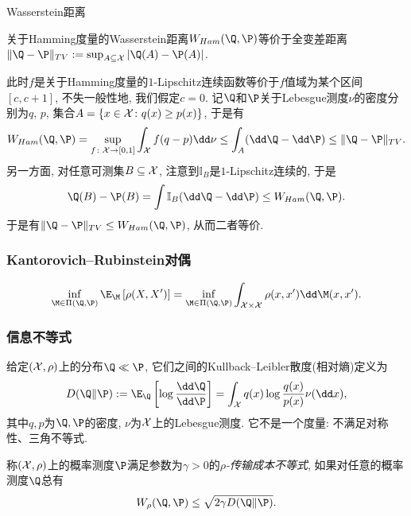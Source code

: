 Wasserstein距离


\begin{example}[Hamming度量和全变差距离]
	关于Hamming度量的Wasserstein距离$W_{Ham}(\Q, \P)$等价于全变差距离$\|\Q - \P\|_{TV} := \sup_{A \subseteq \cX} |\Q(A) - \P(A)|$. 
	
	此时$f$是关于Hamming度量的$1$-Lipschitz连续函数等价于$f$值域为某个区间$[c, c+1]$, 不失一般性地, 我们假定$c = 0$. 
	记$\Q$和$\P$关于Lebesgue测度$\nu$的密度分别为$q$, $p$, 集合$A = \{x \in \mathcal{X} \colon q(x) \geq p(x)\} $, 于是有
	\begin{equation*}
		W_{Ham}(\Q, \P)
		= \sup_{f \colon \cX \to [0, 1]} \int_{\cX} f (q - p) \dd \nu 
		\leq \int_A (\dd \Q - \dd \P)
		\leq \|\Q - \P\|_{TV}. 
	\end{equation*}
	另一方面, 对任意可测集$B \subseteq \mathcal{X}$, 注意到$\mathbb{I}_B$是$1$-Lipschitz连续的, 于是
	\begin{equation*}
		\Q(B) - \P(B) 
		= \int \mathbb{I}_B (\dd \Q - \dd \P) 
		\leq W_{Ham}(\Q, \P). 
	\end{equation*}
	于是有$\|\Q - \P\|_{TV} \leq W_{Ham}(\Q, \P)$, 从而二者等价. 
\end{example}

\subsubsection{Kantorovich–Rubinstein对偶}

\begin{equation*}
	\inf_{\M \in \Pi(\Q, \P)} \E_{\M} \left[ \rho(X, X') \right]
	= \inf_{\M \in \Pi(\Q, \P)} \int_{\cX \times \cX} \rho(x, x') \dd \M(x, x'). 
\end{equation*}

\subsubsection{信息不等式}

给定$(\mathcal{X}, \rho)$上的分布$\Q \ll \P$, 它们之间的Kullback–Leibler散度(相对熵)定义为
\begin{equation}
	D(\Q \| \P)
	:= \E_{\Q} \left[ \log \frac{\dd \Q}{\dd \P} \right]
	= \int_{\cX} q(x) \log \frac{q(x)}{p(x)} \nu(\dd x), 
\end{equation}
其中$q, p$为$\Q, \P$的密度, $\nu$为$\mathcal{X}$上的Lebesgue测度. 
它不是一个度量: 不满足对称性、三角不等式. 
 
 称$(\mathcal{X}, \rho)$上的概率测度$\P$满足参数为$\gamma > 0$的\emph{$\rho$-传输成本不等式}, 如果对任意的概率测度$\Q$总有
 \begin{equation}\label{eq:TransportationCostInequality}
 	W_{\rho} (\Q, \P) \leq \sqrt{2 \gamma D(\Q \| \P)}.
 \end{equation}

